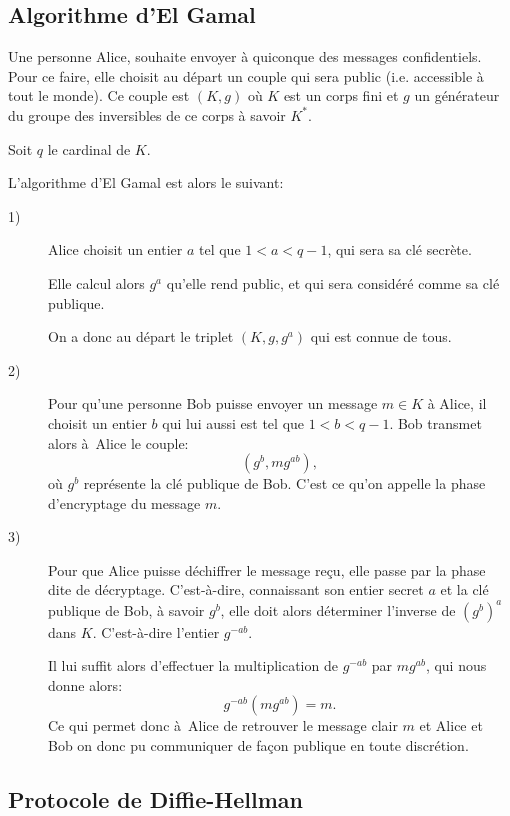 \subsection{Algorithme d'El Gamal}
Une personne Alice, souhaite envoyer à quiconque des messages confidentiels. Pour ce faire, elle choisit au départ un couple qui sera public (i.e. accessible à tout le monde). Ce couple est $(K,g)$ où $K$ est un corps fini et $g$ un générateur du groupe des inversibles de ce corps à savoir $K^{*}$. 

Soit $q$ le cardinal de $K$.

L'algorithme d'El Gamal est alors le suivant:

\begin{description}
    \item[1)] Alice choisit un entier $a$ tel que $1<a<q-1$, qui sera sa clé secrète.

        Elle calcul alors $g^{a}$ qu'elle rend public, et qui sera considéré comme sa clé publique.

        On a donc au départ le triplet $(K,g,g^{a})$ qui est connue de tous.

    \item[2)] Pour qu'une personne Bob puisse envoyer un message $m \in K$ à Alice, il choisit un entier $b$ qui lui aussi est tel que $1<b<q-1$. Bob transmet alors à Alice le couple:
        \[
            (g^{b},mg^{ab})
        ,\] 
        où $g^{b}$ représente la clé publique de Bob.
        C'est ce qu'on appelle la phase d'encryptage du message $m$.

    \item[3)] Pour que Alice puisse déchiffrer le message reçu, elle passe par la phase dite de décryptage. C'est-à-dire, connaissant son entier secret $a$ et la clé publique de Bob, à savoir $g^{b}$, elle doit alors déterminer l'inverse de $(g^{b})^{a}$ dans $K$. C'est-à-dire l'entier $g^{-ab}$. 

        Il lui suffit alors d'effectuer la multiplication de $g^{-ab}$ par $mg^{ab}$, qui nous donne alors:
        \[
        g^{-ab}\left( mg^{ab} \right)=m 
        .\] 
        Ce qui permet donc à Alice de retrouver le message clair $m$ et Alice et Bob on donc pu communiquer de façon publique en toute discrétion.
\end{description}

\subsection{Protocole de Diffie-Hellman}

